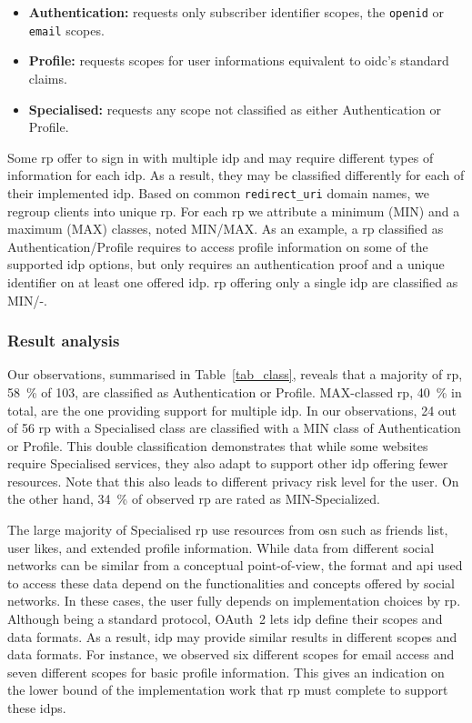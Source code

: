 \begin{itemize}
\item \textbf{Authentication:} requests only subscriber identifier scopes, \eg the \texttt{openid} or \texttt{email} scopes.
\item \textbf{Profile:} requests scopes for user informations equivalent to \gls{oidc}'s standard claims.
\item \textbf{Specialised:} requests any scope not classified as either Authentication or Profile.
\end{itemize}

Some \gls{rp} offer to sign in with multiple \gls{idp} and may require different types of information for each \gls{idp}.
As a result, they may be classified differently for each of their implemented \gls{idp}.
Based on common \texttt{redirect\_uri} domain names, we regroup clients into unique \gls{rp}. 
For each \gls{rp} we attribute a minimum (MIN) and a maximum (MAX) classes, noted MIN/MAX.
As an example, a \gls{rp} classified as Authentication/Profile requires to access profile information on some of the supported \gls{idp} options, but only requires an authentication proof and a unique identifier on at least one offered \gls{idp}.
\gls{rp} offering only a single \gls{idp} are classified as MIN/-.

\subsubsection{Result analysis}
Our observations, summarised in Table~\ref{tab_class}, reveals that a majority of \gls{rp}, \SI{58}{\percent} of 103, are classified as Authentication or Profile. 
MAX-classed \gls{rp}, \SI{40}{\percent} in total, are the one providing support for multiple \gls{idp}.
In our observations, 24 out of 56 \gls{rp} with a Specialised class are classified with a MIN class of Authentication or Profile.
This double classification demonstrates that while some websites require Specialised services, they also adapt to support other \gls{idp} offering fewer resources.
Note that this also leads to different privacy risk level for the user.
On the other hand, \SI{34}{\percent} of observed \gls{rp} are rated as MIN-Specialized.

The large majority of Specialised \gls{rp} use resources from \gls{osn} such as friends list, user likes, and extended profile information.
While data from different social networks can be similar from a conceptual point-of-view, the format and \gls{api} used to access these data depend on the functionalities and concepts offered by social networks.
In these cases, the user fully depends on implementation choices by \gls{rp}.
Although being a standard protocol, OAuth~2 lets \gls{idp} define their scopes and data formats.
As a result, \gls{idp} may provide similar results in different scopes and data formats.
For instance, we observed six different scopes for email access and seven different scopes for basic profile information.
This gives an indication on the lower bound of the implementation work that \gls{rp} must complete to support these \gls{idp}s. 

